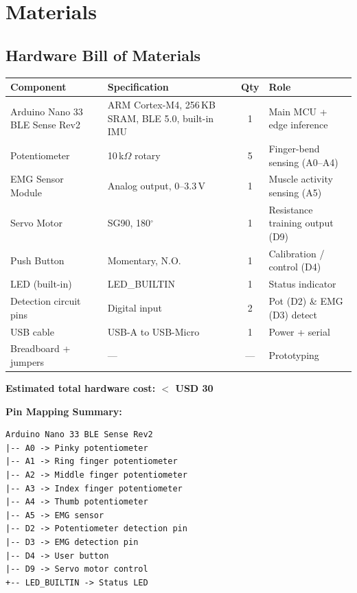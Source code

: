 \documentclass[12pt,a4paper]{article}
\begin{document}
\section{Materials}

\subsection{Hardware Bill of Materials}
\begin{center}
\begin{tabular}{@{}p{4.2cm} p{5.0cm} c p{3.8cm}@{}}
\toprule
\textbf{Component} & \textbf{Specification} & \textbf{Qty} & \textbf{Role} \\
\midrule
Arduino Nano 33 BLE Sense Rev2 & ARM Cortex-M4, 256\,KB SRAM, BLE 5.0, built-in IMU & 1 & Main MCU + edge inference \\
Potentiometer & 10\,k$\Omega$ rotary & 5 & Finger-bend sensing (A0--A4) \\
EMG Sensor Module & Analog output, 0--3.3\,V & 1 & Muscle activity sensing (A5) \\
Servo Motor & SG90, 180$^\circ$ & 1 & Resistance training output (D9) \\
Push Button & Momentary, N.O. & 1 & Calibration / control (D4) \\
LED (built-in) & LED\_BUILTIN & 1 & Status indicator \\
Detection circuit pins & Digital input & 2 & Pot (D2) \& EMG (D3) detect \\
USB cable & USB-A to USB-Micro & 1 & Power + serial \\
Breadboard + jumpers & --- & --- & Prototyping \\
\bottomrule
\end{tabular}
\end{center}

\textbf{Estimated total hardware cost: $<$ USD 30}

\textbf{Pin Mapping Summary:}
\begin{lstlisting}[style=plainstyle]
Arduino Nano 33 BLE Sense Rev2
|-- A0 -> Pinky potentiometer
|-- A1 -> Ring finger potentiometer
|-- A2 -> Middle finger potentiometer
|-- A3 -> Index finger potentiometer
|-- A4 -> Thumb potentiometer
|-- A5 -> EMG sensor
|-- D2 -> Potentiometer detection pin
|-- D3 -> EMG detection pin
|-- D4 -> User button
|-- D9 -> Servo motor control
+-- LED_BUILTIN -> Status LED
\end{lstlisting}
\end{document}
